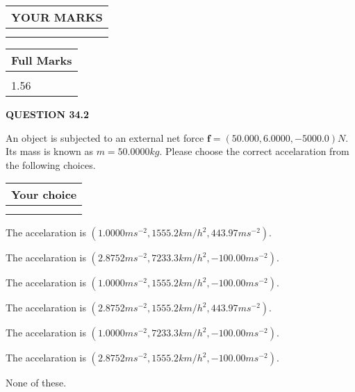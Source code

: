 \documentclass[12pt]{article}
\begin{document}
   
  
\vspace{0.2in}
  
\noindent\begin{tabular}{|l|}
\hline
 YOUR MARKS  \\
\hline
 \\ 
 \\ 
\hline
\end{tabular}
\hspace{0.05in} \begin{tabular}{|l|}
\hline
 Full Marks  \\
\hline
 \\ 
1.56 \\
\hline
\end{tabular}
{\textbf{\Large{QUESTION
34.2 
}}}
  
  
 
An object is subjected to an external net force $\mathbf{f}=(
50.000 ,
6.0000,
-5000.0  )N$. Its mass is known as
$m= %
50.0000  kg$. Please choose the correct accelaration
from the following choices.
 
  
  
\noindent\hspace{3.0in} \begin{tabular}{|l|}
\hline
Your choice \\
\hline
 \\ 
 \\ 
\hline
\end{tabular}
  
  
 
 
The accelaration is
$(
1.0000ms^{-2},
1555.2km/h^2,
443.97ms^{-2}
).
$
 
 
The accelaration is
$(
2.8752ms^{-2},
7233.3km/h^2,
-100.00ms^{-2}
).
$
 
 
The accelaration is
$(
1.0000ms^{-2},
1555.2km/h^2,
-100.00ms^{-2}
).
$
 
 
The accelaration is
$(
2.8752ms^{-2},
1555.2km/h^2,
443.97ms^{-2}
).
$
 
 
The accelaration is
$(
1.0000ms^{-2},
7233.3km/h^2,
-100.00ms^{-2}
).
$
 
 
The accelaration is
$(
2.8752ms^{-2},
1555.2km/h^2,
-100.00ms^{-2}
).
$
 
 
 None of these.
 
\end{document}
